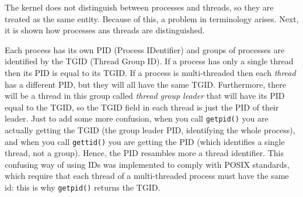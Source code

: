 The kernel does not distinguish between processes and threads, so they are treated as the same entity. Because of this, a problem in terminology arises. Next, it is shown how processes ans threads are distinguished.

Each process has its own PID (Process IDentifier) and groups of processes are identified by the TGID (Thread Group ID). If a process has only a single thread then its PID is equal to its TGID. If a process is multi-threaded then each \textit{thread} has a different PID, but they will all have the same TGID. Furthermore, there will be a thread in this group called \textit{thread group leader} that will have its PID equal to the TGID, so the TGID field in each thread is just the PID of their leader. Just to add some more confusion, when you call \verb|getpid()| you are actually getting the TGID (the group leader PID, identifying the whole process), and when you call \verb|gettid()| you are getting the PID (which identifies a single thread, not a group). Hence, the PID resambles more a thread identifier.
This confusing way of using IDs was implemented to comply with POSIX standards, which require that each thread of a multi-threaded process must have the same id: this is why \verb|getpid()| returns the TGID.

